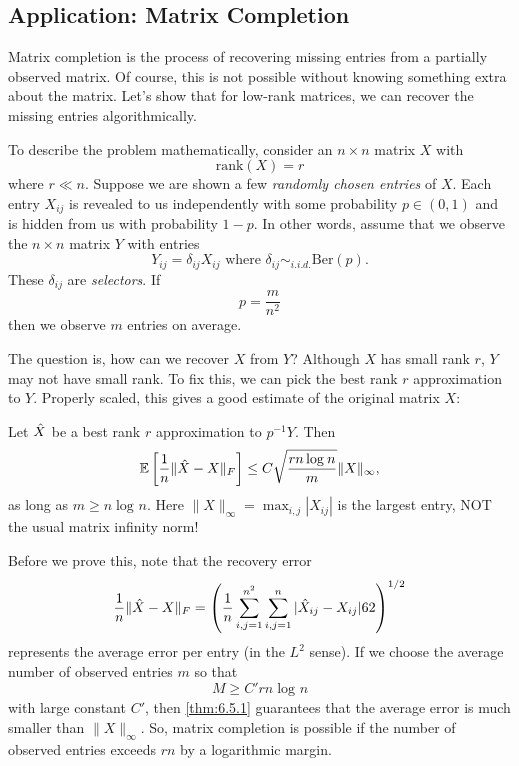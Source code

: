 \subsection{Application: Matrix Completion}
Matrix completion is the process of recovering missing entries from a partially observed matrix. Of course, 
this is not possible without knowing something extra about the matrix. Let's show that for low-rank matrices, 
we can recover the missing entries algorithmically.

To describe the problem mathematically, consider an $n \times n$ matrix $X$ with 
\[ \mathrm{rank}(X) = r \]
where $r \ll n$. Suppose we are shown a few \textit{randomly chosen entries} of $X$. Each entry $X_{ij}$ is 
revealed to us independently with some probability $p \in (0, 1)$ and is hidden from us with probability 
$1 - p$. In other words, assume that we observe the $n \times n$ matrix $Y$ with entries 
\[ Y_{ij} = \delta_{ij}X_{ij} \text{ where } \delta_{ij} \sim_{i.i.d.} \mathrm{Ber}(p). \]
These $\delta_{ij}$ are \textit{selectors}. If 
\[ p = \frac{m}{n^2} \]
then we observe $m$ entries on average.

The question is, how can we recover $X$ from $Y$? Although $X$ has small rank $r$, $Y$ may not have small rank. 
To fix this, we can pick the best rank $r$ approximation to $Y$. Properly scaled, this gives a good estimate of 
the original matrix $X$:

\begin{theorem}
\label{thm:6.5.1} 
Let $\Hat{X}$ be a best rank $r$ approximation to $p^{-1}Y$. Then 
\[ \mathbb{E}\left[ \frac{1}{n}\lVert \Hat{X} - X \rVert_{F} \right] \leq 
C \sqrt{\frac{rn \log_{}{n}}{m}} \lVert X \rVert_{\infty}, \]
as long as $m \geq n \log_{}{n}$. Here $\lVert X \rVert_{\infty} = \max_{i, j} |X_{ij}|$ is the largest entry, 
NOT the usual matrix infinity norm!
\end{theorem}

Before we prove this, note that the recovery error 
\[ \frac{1}{n}\lVert \Hat{X} - X \rVert_{F} = \left( \frac{1}{n}\sum_{i, j = 1}^{n^2} 
\sum_{i, j = 1}^{n} |\Hat{X}_{ij} - X_{ij}|62 \right)^{1/2} \]
represents the average error per entry (in the $L^2$ sense). If we choose the average number of observed entries 
$m$ so that 
\[ M \geq C' rn \log_{}{n} \]
with large constant $C'$, then \cref{thm:6.5.1} guarantees that the average error is much smaller than 
$\lVert X \rVert_{\infty}$. So, matrix completion is possible if the number of observed entries exceeds $rn$ by 
a logarithmic margin.


